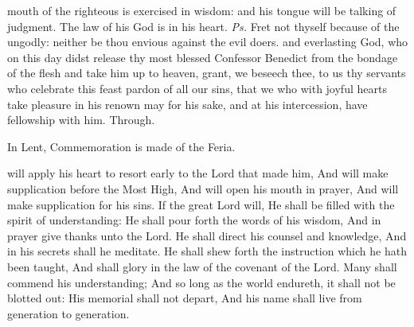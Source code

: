 \introit
 mouth of the righteous is exercised in wisdom: and his tongue will be talking of judgment. The law of his God is in his heart. \textit{Ps.} Fret not thyself because of the ungodly: neither be thou envious against the evil doers.
\collect
{} and everlasting God, who on this day didst release thy most blessed Confessor Benedict from the bondage of the flesh and take him up to heaven, grant, we beseech thee, to us thy servants who celebrate this feast pardon of all our sins, that we who with joyful hearts take pleasure in his renown may for his sake, and at his intercession, have fellowship with him. Through.
\begin{rubric}
    In Lent, Commemoration is made of the Feria.
\end{rubric}
 will apply his heart to resort early to the Lord that made him, And will make supplication before the Most High, And will open his mouth in prayer, And will make supplication for his sins. If the great Lord will, He shall be filled with the spirit of understanding: He shall pour forth the words of his wisdom, And in prayer give thanks unto the Lord. He shall direct his counsel and knowledge, And in his secrets shall he meditate. He shall shew forth the instruction which he hath been taught, And shall glory in the law of the covenant of the Lord. Many shall commend his understanding; And so long as the world endureth, it shall not be blotted out: His memorial shall not depart, And his name shall live from generation to generation. 

